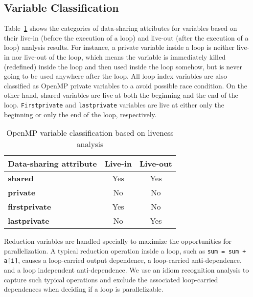 \subsection{Variable Classification}
Table~\ref{tab:varClassification} shows the categories of
data-sharing attributes for variables based on their live-in (before the
execution of a loop) and live-out (after the execution of a loop)
analysis results. For instance, a private variable inside a
loop is neither live-in nor live-out of the loop, which means the 
variable is immediately killed (redefined) inside the loop and then used inside
the loop somehow, but is never going to be used anywhere after the loop.
All loop index variables are also classified as OpenMP private variables to a avoid
possible race condition.
On the other hand, shared variables are live at both the beginning and the end of the loop.
\lstinline{Firstprivate} and \lstinline{lastprivate} variables are live at either only the beginning or
only the end of the loop, respectively.

\begin{table}[htbp]
\caption{OpenMP variable classification based on liveness analysis}
        \centering
\begin{tabular}{||l||c|c||} \hline
\textbf{Data-sharing attribute} & \textbf{Live-in} & \textbf{Live-out} \\ \hline
{\bfseries\scriptsize{shared}} & Yes & Yes \\ \hline
{\bfseries\scriptsize{private}} & No & No       \\ \hline
{\bfseries\scriptsize{firstprivate}} & Yes & No \\ \hline
{\bfseries\scriptsize{lastprivate}} & No & Yes  \\ \hline
\end{tabular} 
\label{tab:varClassification}
\end{table}

Reduction variables are handled specially to maximize the opportunities for
parallelization.
A typical reduction operation inside a loop, such as
\lstinline{sum = sum + a[i]},
causes a loop-carried output
dependence, a loop-carried anti-dependence, and a loop independent anti-dependence.
We use an idiom recognition analysis to capture such typical operations and exclude
the associated loop-carried dependences when deciding if a loop is
parallelizable.

